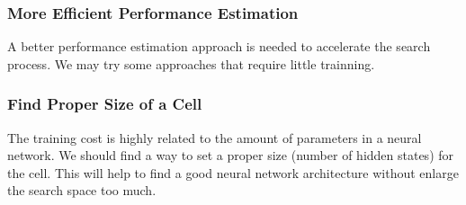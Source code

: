 \documentclass[conference]{IEEEtran}
\begin{document}
  \subsubsection{More Efficient Performance Estimation}
  A better performance estimation approach is needed to accelerate the search process. We may try some approaches that require little trainning.
  
  \subsubsection{Find Proper Size of a Cell}
  The training cost is highly related to the amount of parameters in a neural network. We should find a way to set a proper size (number of hidden states) for the cell. This will help to find a good neural network architecture without enlarge the search space too much.
   



\end{document}
